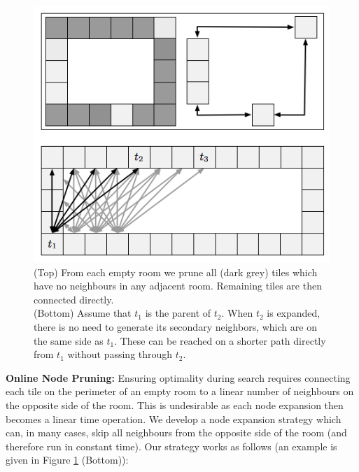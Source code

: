 \begin{figure}[t]
       \begin{center}
                       \includegraphics[scale=0.5, trim = 10mm 10mm 10mm 0mm]{diagrams/branching.png}
       \end{center}
	\vspace{-3pt}
       \caption{(Top) From each empty room we prune all (dark grey) tiles which have no neighbours in any adjacent room. 
Remaining tiles are then connected directly.
\\
		(Bottom) Assume that $t_{1}$ is the parent of $t_2$. When $t_2$ is expanded,
there is no need to generate its secondary neighbors, which are on the same side as $t_1$.
These can be reached on a shorter path directly from $t_1$ without passing through $t_2$.
}
       \label{fig-branching}
\end{figure}

\textbf{Online Node Pruning:} 
Ensuring optimality during search requires connecting each tile on the perimeter
of an empty room to a linear number of neighbours on the opposite side of the
room.
This is undesirable as each node expansion then becomes a linear time operation. 
We develop a node expansion strategy which can, in many cases, skip all neighbours from 
the opposite side of the room (and therefore run in constant time).
Our strategy works as follows (an example is given in Figure \ref{fig-branching}
(Bottom)):

